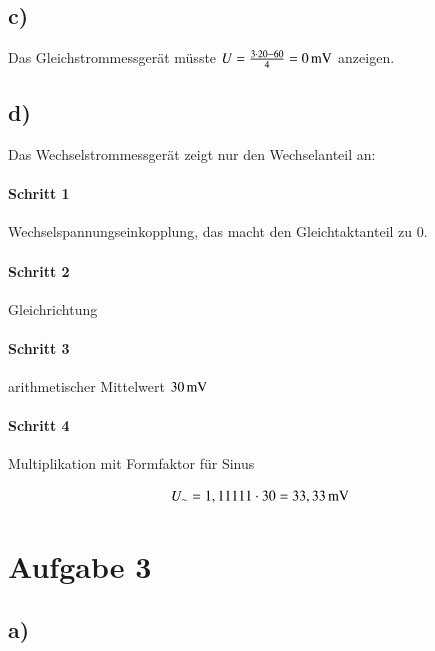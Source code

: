 \subsection*{c)}

Das Gleichstrommessgerät müsste $U = \frac{3 \cdot 20 - 60}{4} = \unit[0]{mV}$ anzeigen.


\subsection*{d)}

Das Wechselstrommessgerät zeigt nur den Wechselanteil an:

\paragraph{Schritt 1}

Wechselspannungseinkopplung, das macht den Gleichtaktanteil zu 0.

\paragraph{Schritt 2}

Gleichrichtung

\paragraph{Schritt 3}

arithmetischer Mittelwert $\unit[30]{mV}$

\paragraph{Schritt 4}

Multiplikation mit Formfaktor für Sinus

\begin{align*}
U_\sim = 1,11111 \cdot 30 = \unit[33,33]{mV}
\end{align*}


\section{Aufgabe 3}

\subsection*{a)}



